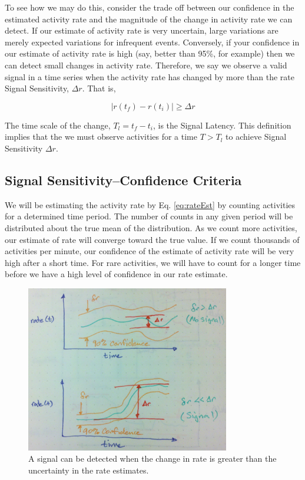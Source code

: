 \documentclass{article}
\begin{document}
To see how we may do this, consider the trade off between our confidence in the estimated activity rate and the magnitude of the change in activity rate we can detect.  If our estimate of activity rate is very uncertain, large variations are merely expected variations for infrequent events.  Conversely, if your confidence in our estimate of activity rate is high (say, better than 95\%, for example) then we can detect small changes in activity rate.  Therefore, we say we observe a valid signal in a time series when the activity rate has changed by more than the rate Signal Sensitivity, $\Delta r$.  That is,

\begin{equation}
    \label{eq:signal}
    | r(t_f) - r(t_i) | \geq \Delta r
\end{equation}

The time scale of the change, $T_l = t_f - t_i$, is the Signal Latency.  This definition implies that the we must observe activities for a time $T > T_l$ to achieve Signal Sensitivity $\Delta r$.

\subsection{Signal Sensitivity--Confidence Criteria} 

We will be estimating the activity rate by Eq. \ref{eq:rateEst} by counting activities for a determined time period.  The number of counts in any given period will be distributed about the true mean of the distribution. As we count more activities, our estimate of rate will converge toward the true value.  If we count thousands of activities per minute, our confidence of the estimate of activity rate will be very high after a short time.  For rare activities, we will have to count for a longer time before we have a high level of confidence in our rate estimate.

%
\begin{figure}[h]
    \centering
    \includegraphics[width=3.5in]{./imgs/signal.jpg}
        \caption{A signal can be detected when the change in rate is greater than the uncertainty in the rate estimates.}
    \label{fig:signal}
\end{figure}
%
%
\end{document}
